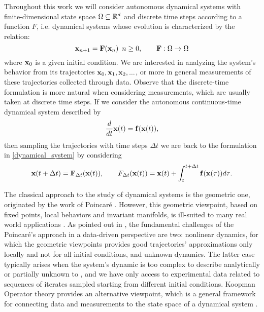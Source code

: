 Throughout this work we will consider autonomous dynamical systems with finite-dimensional state space $\Omega\subseteq\mathbb{R}^d$ and discrete time steps according to a function $F$, i.e. dynamical systems whose evolution is characterized by the relation:
\begin{equation}
    \label{dynamical_system}
    \vb{x}_{n+1} = \vb{F}(\vb{x}_n)\,\,\,n\geq 0, \qquad \vb{F}:\Omega \to \Omega
\end{equation}
where $\vb{x}_0$ is a given initial condition. We are interested in analyzing the system's behavior from its trajectories $\vb{x}_0, \vb{x}_1, \vb{x}_2,...$, or more in general measurements of these trajectories collected through data. Observe that the discrete-time formulation is more natural when considering measurements, which are usually taken at discrete time steps. If we consider the autonomous continuous-time dynamical system described by
\begin{equation*}
    \frac{d}{dt}\vb{x}(t) = \vb{f}(\vb{x}(t)),
\end{equation*}
then sampling the trajectories with time steps $\Delta t$ we are back to the formulation in \eqref{dynamical_system} by considering
\begin{equation}
    \label{continuous_to_discrete}
    \vb{x}(t+\Delta t) = \vb{F}_{\Delta t}(\vb{x}(t)), \qquad \vb\vb{F}_{\Delta t}(\vb{x}(t)) = \vb{x}(t) + \int_{t}^{t+\Delta t}{\vb{f}(\vb{x}(\tau)) d\tau}.
\end{equation}

The classical approach to the study of dynamical systems is the geometric one, originated by the work of Poincaré \cite{henri_poincare_les_1899}. However, this geometric viewpoint, based on fixed points, local behaviors and invariant manifolds, is ill-suited to many real world applications \cite{budisic_applied_2012}. As pointed out in \cite{colbrook_rigorous_2021}, the fundamental challenges of the Poincaré's approach in a data-driven perspective are two: nonlinear dynamics, for which the geometric viewpoints provides good trajectories' approximations only locally and not for all initial conditions, and unknown dynamics. The latter case typically arises when the system's dynamic is too complex to describe analytically or partially unknown to , and we have only access to experimental data related to sequences of iterates sampled starting from different initial conditions. Koopman Operator theory \cite{koopman_dynamical_1932, koopman_hamiltonian_1931} provides an alternative viewpoint, which is a general framework for connecting data and measurements to the state space of a dynamical system \cite{arbabi_introduction_nodate}.

